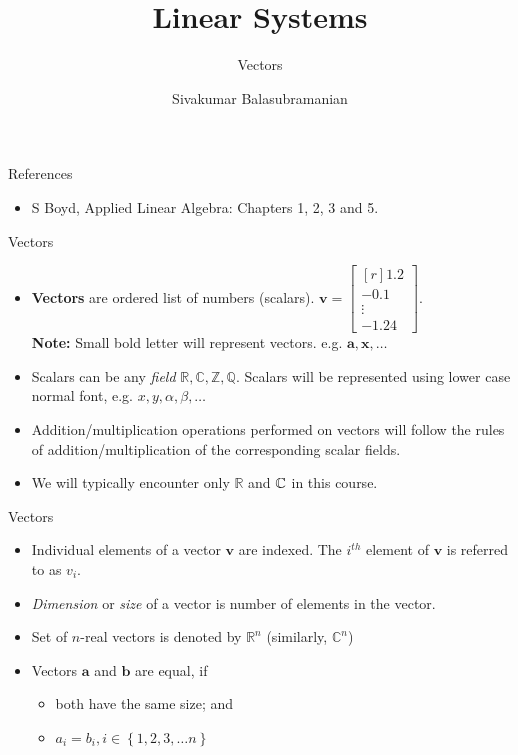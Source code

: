 \documentclass[aspectratio=169]{beamer}
\title{Linear Systems}
\subtitle{Vectors}
\author{Sivakumar Balasubramanian}
\institute[Christian Medical College] %
{
  \inst{}%
  Department of Bioengineering\\
  Christian Medical College, Bagayam\\
  Vellore 632002
}
\date{}
\let\olditem\item
\renewcommand{\item}{\setlength{\itemsep}{\fill}\olditem}
\def\mb{\ensuremath\mathbb}
\begin{document}
\begin{frame}
  \titlepage
\end{frame}

\begin{frame}[t]{References}
\begin{itemize}
\item S Boyd, Applied Linear Algebra: Chapters 1, 2, 3 and 5.
\end{itemize}
\end{frame}

\begin{frame}[t]{Vectors}
\begin{itemize}
  \item \textbf{Vectors} are ordered list of numbers (scalars). $\mathbf{v} = \begin{bmatrix*}[r] 1.2 \\ -0.1 \\ \vdots \\-1.24 \end{bmatrix*}$.\\
  \textbf{Note:} Small bold letter will represent vectors. e.g. $\mathbf{a}, \mathbf{x}, \ldots $
  
  \item Scalars can be any \textit{field} $\mathbb{R}, \mathbb{C}, \mathbb{Z}, \mathbb{Q}$. Scalars will be represented using lower case normal font, e.g. $x, y, \alpha, \beta, \ldots$
  
  \item Addition/multiplication operations performed on vectors will follow the rules of addition/multiplication of the corresponding scalar fields.
  
  \item We will typically encounter only $\mathbb{R}$ and $\mb{C}$ in this course.
\end{itemize}
\end{frame}


\begin{frame}[t]{Vectors}
\begin{itemize}
  \item Individual elements of a vector $\mathbf{v}$ are indexed. The $i^{th}$ element of $\mathbf{v}$ is referred to as $v_i$.

  \item \textit{Dimension} or \textit{size} of a vector is number of elements in the vector.
  
  \item Set of $n$-real vectors is denoted by $\mathbb{R}^n$ (similarly, $\mathbb{C}^n$)
  
  \item Vectors $\mathbf{a}$ and $\mathbf{b}$ are equal, if
  \begin{itemize}
    \item both have the same size; and
    \item $a_i = b_i, i \in \left\{1, 2, 3, \ldots n\right\}$
  \end{itemize}
  \end{itemize}
\end{frame}
\end{document}

